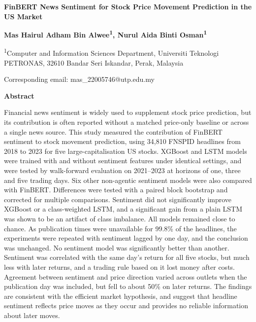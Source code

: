 \documentclass[a4paper,11pt]{article}
\makeatletter
\newcommand{\PaperTitle}{FinBERT News Sentiment for Stock Price Movement Prediction in the US Market}
\newcommand{\WriterName}{Mas Hairul Adham Bin Alwee}
\newcommand{\CoWriterName}{Nurul Aida Binti Osman}
\newcommand{\AffiliationOne}{Computer and Information Sciences Department, Universiti Teknologi PETRONAS, 32610 Bandar Seri Iskandar, Perak, Malaysia}
\newcommand{\CorrespondingEmail}{mas\_22005746@utp.edu.my}
\makeatother
\begin{document}
\begin{center}
\singlespacing
{\bfseries \PaperTitle\par}
\vspace{6pt}
{\bfseries \WriterName\textsuperscript{1}, \CoWriterName\textsuperscript{1}\par}
\vspace{6pt}
\textsuperscript{1}\AffiliationOne\par
\vspace{6pt}
Corresponding email: \CorrespondingEmail\par
\end{center}


\vspace{12pt}
{\bfseries Abstract\par}
{\singlespacing
Financial news sentiment is widely used to supplement stock price prediction, but its contribution is often reported without a matched price-only baseline or across a single news source. This study measured the contribution of FinBERT sentiment to stock movement prediction, using 34,810 FNSPID headlines from 2018 to 2023 for five large-capitalisation US stocks. XGBoost and LSTM models were trained with and without sentiment features under identical settings, and were tested by walk-forward evaluation on 2021--2023 at horizons of one, three and five trading days. Six other non-agentic sentiment models were also compared with FinBERT. Differences were tested with a paired block bootstrap and corrected for multiple comparisons. Sentiment did not significantly improve XGBoost or a class-weighted LSTM, and a significant gain from a plain LSTM was shown to be an artifact of class imbalance. All models remained close to chance. As publication times were unavailable for 99.8\% of the headlines, the experiments were repeated with sentiment lagged by one day, and the conclusion was unchanged. No sentiment model was significantly better than another. Sentiment was correlated with the same day's return for all five stocks, but much less with later returns, and a trading rule based on it lost money after costs. Agreement between sentiment and price direction varied across outlets when the publication day was included, but fell to about 50\% on later returns. The findings are consistent with the efficient market hypothesis, and suggest that headline sentiment reflects price moves as they occur and provides no reliable information about later moves.
\par}
\end{document}
